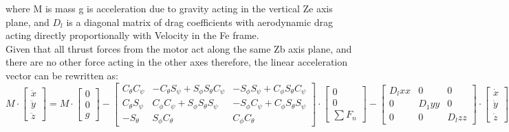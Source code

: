 \documentclass[12pt,a4paper,twoside]{report}
\begin{document}
					where M is mass g is acceleration due to gravity acting in the vertical Ze axis plane, and \(D_l\) is a diagonal matrix of drag coefficients with aerodynamic drag acting directly proportionally with Velocity in the Fe frame.
					\\
					Given that all thrust forces from the motor act along the same Zb axis plane, and there are no other force acting in the other axes therefore, the linear acceleration vector can be rewritten as:
					\\
					$$ 
					M 
					\cdot 
					\begin{bmatrix}
						\ddot{x} \\
						\ddot{y} \\
						\ddot{z}
					\end{bmatrix}
					=
					M 
					\cdot
					\begin{bmatrix}
						0 \\
						0 \\
						g
					\end{bmatrix}
					-
					\begin{bmatrix}
						C_\theta C_\psi & -C_\theta S_\psi + S_\phi S_\theta C_\psi & -S_\phi S_\psi + C_\phi S_\theta C_\psi \\
						C_\theta S_\psi &  C_\phi C_\psi + S_\phi S_\theta S_\psi   & -S_\phi C_\psi + C_\phi S_\theta S_\psi \\
						-S_\theta       &  S_\phi C_\theta                          &  C_\phi C_\theta
					\end{bmatrix}
					\cdot
					\begin{bmatrix}
						0 \\
						0 \\
						\sum F_n 
					\end{bmatrix}
					-
					\begin{bmatrix}
						D_lxx & 0 & 0 \\
						0 & D_1yy & 0 \\
						0 & 0 & D_lzz
					\end{bmatrix}
					\cdot
					\begin{bmatrix}
						\dot{x} \\
						\dot{y} \\
						\dot{z} 
					\end{bmatrix}
					$$ 
					\\
					
\end{document}

